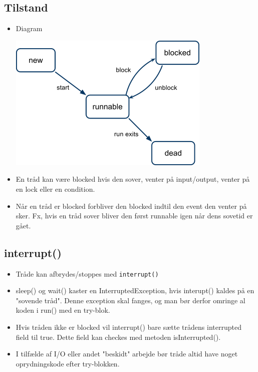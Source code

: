 \subsection{Tilstand}

\begin{itemize}
  \item Diagram
  
  \begin{center}
    \includegraphics[scale=0.7]{images/thread_states.png}
  \end{center}
    

  \item En tråd kan være blocked hvis den sover, venter på input/output, venter på en lock eller en condition.
  \item Når en tråd er blocked forbliver den blocked indtil den event den venter på sker. Fx, hvis en tråd sover bliver den først runnable igen når dens sovetid er gået.
\end{itemize}

\subsection{interrupt()}

\begin{itemize}
  \item Tråde kan afbrydes/stoppes med \verb|interrupt()| 
  \item sleep() og wait() kaster en InterruptedException, hvis interupt() kaldes på en "sovende tråd". Denne exception skal fanges, og man bør derfor omringe al koden i run() med en try-blok.
  \item Hvis tråden ikke er blocked vil interrupt() bare sætte trådens interrupted field til true. Dette field kan checkes med metoden isInterrupted().
  \item I tilfælde af I/O eller andet "beskidt" arbejde bør tråde altid have noget oprydningskode efter try-blokken.
\end{itemize}

